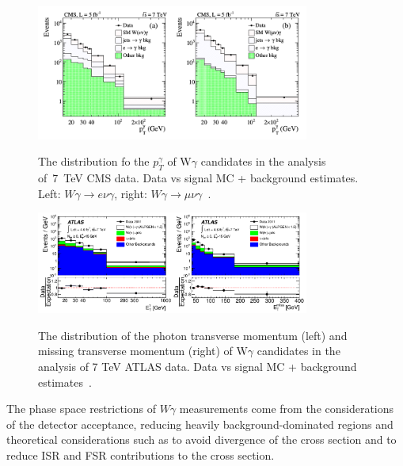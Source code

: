 
\begin{figure}[htb]
  \begin{center}
    {\includegraphics[width=0.80\textwidth]{../figs/WgAbout/Wg7TeV_CMS_ptGamma.png}}
    \caption{The distribution fo the $p_T^\gamma$ of W$\gamma$ candidates in the analysis of~7~TeV CMS data. Data vs signal MC + background estimates. Left: $W\gamma\rightarrow e\nu\gamma$, right: $W\gamma\rightarrow \mu\nu\gamma$~\cite{ref_7TeV_CMS}.}
    \label{fig:Wg7TeV_CMS_ptGamma}
  \end{center}
\end{figure}

\begin{figure}[htb]
  \begin{center}
    {\includegraphics[width=0.80\textwidth]{../figs/WgAbout/Wg7TeV_ATLAS_ptGamma.png}}
    \caption{The distribution of the photon transverse momentum (left) and missing transverse momentum (right) of W$\gamma$ candidates in the analysis of 7 TeV ATLAS data. Data vs signal MC + background estimates~\cite{ref_7TeV_ATLAS}. }
    \label{fig:Wg7TeV_ATLAS_ptGamma}
  \end{center}
\end{figure}

The phase space restrictions of $W\gamma$ measurements come from the considerations of the detector acceptance, reducing heavily background-dominated regions and theoretical considerations such as to avoid divergence of the cross section and to reduce ISR and FSR contributions to the cross section.\\

